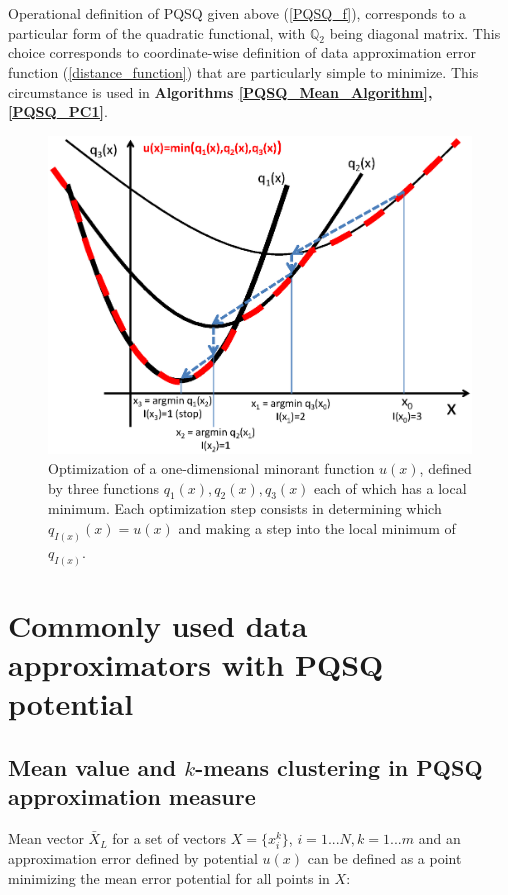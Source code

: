 \documentclass[preprint,12pt,twocolumn]{elsarticle}
\begin{document}
Operational definition of PQSQ given above (\ref{PQSQ_f}), corresponds to a particular form of the quadratic functional, with $\mathbb{Q}_2$ being diagonal matrix. This choice corresponds to coordinate-wise definition of data approximation error function (\ref{distance_function}) that are particularly simple to minimize. This circumstance is used in \textbf{Algorithms \ref{PQSQ_Mean_Algorithm},\ref{PQSQ_PC1}}.

\begin{figure}[h]
\centering\includegraphics[width=0.9\linewidth]{OptimizationAlgorithm.eps}
\caption{Optimization of a one-dimensional minorant function $u(x)$, defined by three functions $q_1(x),q_2(x),q_3(x)$ each of which has a local     minimum.
Each optimization step consists in determining which $q_{I(x)}(x)=u(x)$ and making a step into the local minimum of $q_{I(x)}$. \label{OptimizationFigure}}
\end{figure}


\section{Commonly used data approximators with PQSQ potential}

\subsection{Mean value and $k$-means clustering in PQSQ approximation measure}

Mean vector $\bar{X}_L$  for a set of vectors $X=\{x_i^k\}$, $i=1...N, k=1...m$ and an approximation error defined by potential $u(x)$ can be defined as a point minimizing the mean error potential for all points in  $X$:
\end{document}
